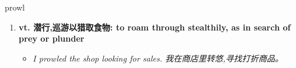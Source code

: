 
\begin{frame}
{\huge prowl}
\begin{center}
\begin{enumerate}\Large
  \item \textbf{vt. 潜行,巡游以猎取食物: to roam through stealthily, as in search of prey or plunder}
  \begin{itemize}
    \item \em{\Large{I prowled the shop looking for sales. 我在商店里转悠,寻找打折商品。}}
  \end{itemize}
\end{enumerate}
\end{center}
\end{frame}
